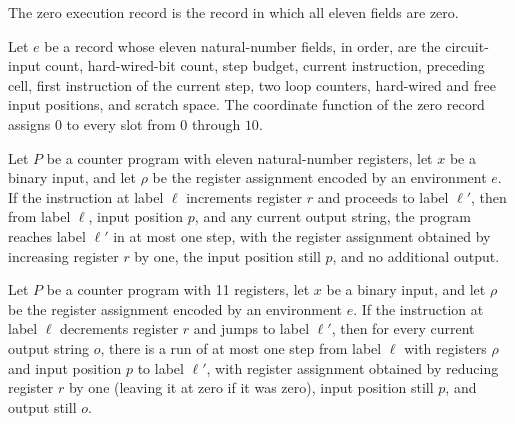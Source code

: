 \begin{definition}
\label{Complexity.UTab.ER.zero}
\leanok
{}
The zero execution record is the record in which all eleven fields are zero.
\end{definition}

\begin{theorem}
\label{Complexity.UTab.ER.zero_f}
\leanok
{}
Let $e$ be a record whose eleven natural-number fields, in order, are the circuit-input
count, hard-wired-bit count, step budget, current instruction, preceding cell, first
instruction of the current step, two loop counters, hard-wired and free input positions,
and scratch space. The coordinate function of the zero record assigns $0$ to every slot
from $0$ through $10$.
\end{theorem}

\begin{theorem}
\label{Complexity.UTab.goes_incR}
\leanok
{}
Let $P$ be a counter program with eleven natural-number registers, let $x$ be a binary
input, and let $\rho$ be the register assignment encoded by an environment $e$. If the
instruction at label $\ell$ increments register $r$ and proceeds to label $\ell'$, then
from label $\ell$, input position $p$, and any current output string, the program reaches
label $\ell'$ in at most one step, with the register assignment obtained by increasing
register $r$ by one, the input position still $p$, and no additional output.
\end{theorem}

\begin{theorem}
\label{Complexity.UTab.goes_decR}
\leanok
{}
Let $P$ be a counter program with 11 registers, let $x$ be a binary input, and let $\rho$
be the register assignment encoded by an environment $e$. If the instruction at label
$\ell$ decrements register $r$ and jumps to label $\ell'$, then for every current output
string $o$, there is a run of at most one step from label $\ell$ with registers $\rho$ and
input position $p$ to label $\ell'$, with register assignment obtained by reducing register
$r$ by one (leaving it at zero if it was zero), input position still $p$, and output
still $o$.
\end{theorem}

